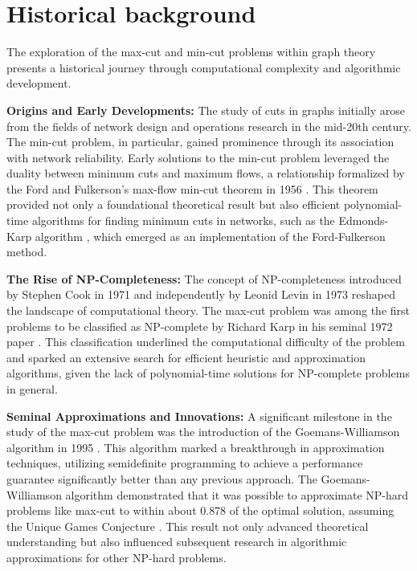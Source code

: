 \section{Historical background}

The exploration of the max-cut and min-cut problems within graph theory presents a historical journey through computational complexity and algorithmic development.

\textbf{Origins and Early Developments:}
The study of cuts in graphs initially arose from the fields of network design and operations research in the mid-20th century. The min-cut problem, in particular, gained prominence through its association with network reliability. Early solutions to the min-cut problem leveraged the duality between minimum cuts and maximum flows, a relationship formalized by the Ford and Fulkerson's max-flow min-cut theorem in 1956 \cite{ford1956maximal}. This theorem provided not only a foundational theoretical result but also efficient polynomial-time algorithms for finding minimum cuts in networks, such as the Edmonds-Karp algorithm \cite{edmonds1972theoretical}, which emerged as an implementation of the Ford-Fulkerson method.

\textbf{The Rise of NP-Completeness:}
The concept of NP-completeness introduced by Stephen Cook in 1971 and independently by Leonid Levin in 1973 reshaped the landscape of computational theory. The max-cut problem was among the first problems to be classified as NP-complete by Richard Karp in his seminal 1972 paper \cite{karp1972reducibility}. This classification underlined the computational difficulty of the problem and sparked an extensive search for efficient heuristic and approximation algorithms, given the lack of polynomial-time solutions for NP-complete problems in general.

\textbf{Seminal Approximations and Innovations:}
A significant milestone in the study of the max-cut problem was the introduction of the Goemans-Williamson algorithm in 1995 \cite{goemans1995improved}. This algorithm marked a breakthrough in approximation techniques, utilizing semidefinite programming to achieve a performance guarantee significantly better than any previous approach. The Goemans-Williamson algorithm demonstrated that it was possible to approximate NP-hard problems like max-cut to within about 0.878 of the optimal solution, assuming the Unique Games Conjecture \cite{khot2007optimal}. This result not only advanced theoretical understanding but also influenced subsequent research in algorithmic approximations for other NP-hard problems.

